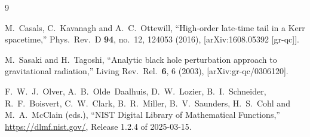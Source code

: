\documentclass[12pt,a4paper]{article}
\begin{document}
\begin{thebibliography}{9}

  M.~Casals, C.~Kavanagh and A.~C.~Ottewill,
  ``High-order late-time tail in a Kerr spacetime,''
  Phys.\ Rev.\ D \textbf{94}, no.~12, 124053 (2016),
  [arXiv:1608.05392 [gr-qc]].

  M.~Sasaki and H.~Tagoshi,
  ``Analytic black hole perturbation approach to gravitational radiation,''
  Living Rev.\ Rel.\ \textbf{6}, 6 (2003),
  [arXiv:gr-qc/0306120].

  F.~W.~J.~Olver, A.~B.~Olde~Daalhuis, D.~W.~Lozier, B.~I.~Schneider,
  R.~F.~Boisvert, C.~W.~Clark, B.~R.~Miller, B.~V.~Saunders,
  H.~S.~Cohl and M.~A.~McClain (eds.),
  ``NIST Digital Library of Mathematical Functions,''
  \url{https://dlmf.nist.gov/}, Release 1.2.4 of 2025-03-15.

\end{thebibliography}
\end{document}
